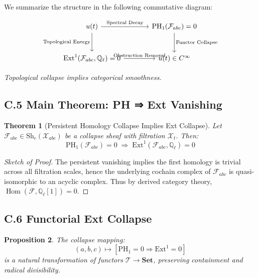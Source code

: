 \documentclass[11pt]{article}
\newtheorem{theorem}{Theorem}[section]
\newtheorem{proposition}[theorem]{Proposition}
\begin{document}
We summarize the structure in the following commutative diagram:

\[
\begin{tikzcd}[row sep=large, column sep=large]
u(t) \arrow[r, "\text{Spectral Decay}"] \arrow[d, swap, "\text{Topological Energy}"]
& \mathrm{PH}_1(\mathcal{F}_{abc}) = 0 \arrow[d, "\text{Functor Collapse}"] \\
\mathrm{Ext}^1(\mathcal{F}_{abc}, \mathbb{Q}_\ell) = 0 \arrow[r, "\text{Obstruction Removal}"]
& u(t) \in C^\infty
\end{tikzcd}
\]

\begin{center}
    \textit{Topological collapse implies categorical smoothness.}
\end{center}

\subsection*{C.5 Main Theorem: PH ⇒ Ext Vanishing}

\begin{theorem}[Persistent Homology Collapse Implies Ext Collapse]
Let \( \mathcal{F}_{abc} \in \mathrm{Sh}_c(\mathcal{X}_{abc}) \) be a collapse sheaf with filtration \( \mathcal{X}_t \).  
Then:
\[
\mathrm{PH}_1(\mathcal{F}_{abc}) = 0 \;\Rightarrow\; \mathrm{Ext}^1(\mathcal{F}_{abc}, \mathbb{Q}_\ell) = 0
\]
\end{theorem}

\begin{proof}[Sketch of Proof]
The persistent vanishing implies the first homology is trivial across all filtration scales, hence  
the underlying cochain complex of \( \mathcal{F}_{abc} \) is quasi-isomorphic to an acyclic complex.  
Thus by derived category theory, \( \operatorname{Hom}(\mathcal{F}, \mathbb{Q}_\ell[1]) = 0 \).
\end{proof}

\subsection*{C.6 Functorial Ext Collapse}

\begin{proposition}
The collapse mapping:
\[
(a,b,c) \mapsto \left[ \mathrm{PH}_1 = 0 \Rightarrow \mathrm{Ext}^1 = 0 \right]
\]
is a natural transformation of functors \( \mathcal{T} \to \mathbf{Set} \), preserving containment and radical divisibility.
\end{proposition}
\end{document}
